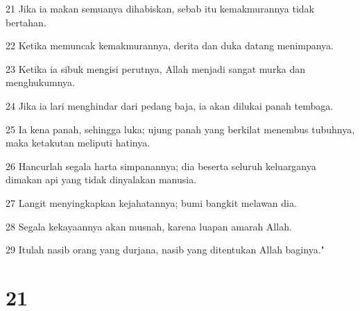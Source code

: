 \par 21 Jika ia makan semuanya dihabiskan, sebab itu kemakmurannya tidak bertahan.
\par 22 Ketika memuncak kemakmurannya, derita dan duka datang menimpanya.
\par 23 Ketika ia sibuk mengisi perutnya, Allah menjadi sangat murka dan menghukumnya.
\par 24 Jika ia lari menghindar dari pedang baja, ia akan dilukai panah tembaga.
\par 25 Ia kena panah, sehingga luka; ujung panah yang berkilat menembus tubuhnya, maka ketakutan meliputi hatinya.
\par 26 Hancurlah segala harta simpanannya; dia beserta seluruh keluarganya dimakan api yang tidak dinyalakan manusia.
\par 27 Langit menyingkapkan kejahatannya; bumi bangkit melawan dia.
\par 28 Segala kekayaannya akan musnah, karena luapan amarah Allah.
\par 29 Itulah nasib orang yang durjana, nasib yang ditentukan Allah baginya."

\chapter{21}

